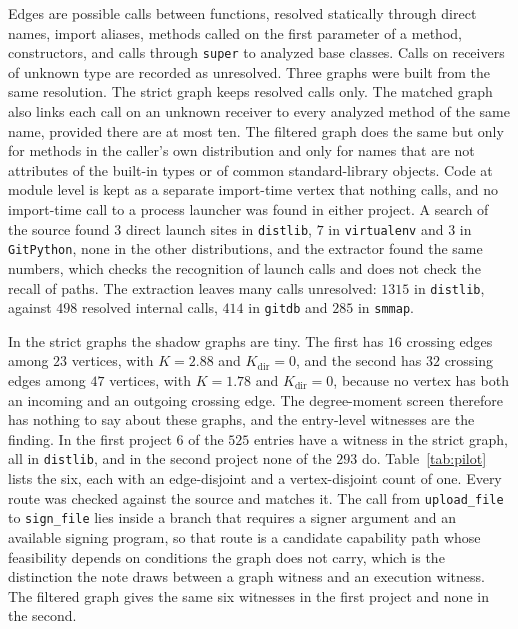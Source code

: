 \documentclass[11pt]{article}
\begin{document}
Edges are possible calls between functions, resolved statically through direct names, import aliases, methods called on the first parameter of a method, constructors, and calls through \texttt{super} to analyzed base classes. Calls on receivers of unknown type are recorded as unresolved. Three graphs were built from the same resolution. The strict graph keeps resolved calls only. The matched graph also links each call on an unknown receiver to every analyzed method of the same name, provided there are at most ten. The filtered graph does the same but only for methods in the caller's own distribution and only for names that are not attributes of the built-in types or of common standard-library objects. Code at module level is kept as a separate import-time vertex that nothing calls, and no import-time call to a process launcher was found in either project. A search of the source found $3$ direct launch sites in \texttt{distlib}, $7$ in \texttt{virtualenv} and $3$ in \texttt{GitPython}, none in the other distributions, and the extractor found the same numbers, which checks the recognition of launch calls and does not check the recall of paths. The extraction leaves many calls unresolved: $1315$ in \texttt{distlib}, against $498$ resolved internal calls, $414$ in \texttt{gitdb} and $285$ in \texttt{smmap}.

In the strict graphs the shadow graphs are tiny. The first has $16$ crossing edges among $23$ vertices, with $K=2.88$ and $K_{\mathrm{dir}}=0$, and the second has $32$ crossing edges among $47$ vertices, with $K=1.78$ and $K_{\mathrm{dir}}=0$, because no vertex has both an incoming and an outgoing crossing edge. The degree-moment screen therefore has nothing to say about these graphs, and the entry-level witnesses are the finding. In the first project $6$ of the $525$ entries have a witness in the strict graph, all in \texttt{distlib}, and in the second project none of the $293$ do. Table~\ref{tab:pilot} lists the six, each with an edge-disjoint and a vertex-disjoint count of one. Every route was checked against the source and matches it. The call from \texttt{upload\_file} to \texttt{sign\_file} lies inside a branch that requires a signer argument and an available signing program, so that route is a candidate capability path whose feasibility depends on conditions the graph does not carry, which is the distinction the note draws between a graph witness and an execution witness. The filtered graph gives the same six witnesses in the first project and none in the second.
\end{document}

